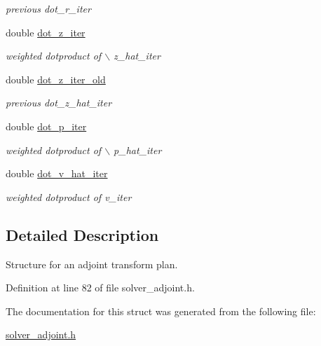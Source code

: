 \begin{CompactItemize}
\begin{CompactList}\small\item\em previous dot\_\-r\_\-iter \item\end{CompactList}\item 
\hypertarget{structinfft__adjoint__plan_6cca862303d84903e408f5a2ea02aa9c}{
double \hyperlink{structinfft__adjoint__plan_6cca862303d84903e408f5a2ea02aa9c}{dot\_\-z\_\-iter}}
\label{structinfft__adjoint__plan_6cca862303d84903e408f5a2ea02aa9c}

\begin{CompactList}\small\item\em weighted dotproduct of $\backslash$ z\_\-hat\_\-iter \item\end{CompactList}\item 
\hypertarget{structinfft__adjoint__plan_a78f22f1c5c917f665b2f1af3e7df191}{
double \hyperlink{structinfft__adjoint__plan_a78f22f1c5c917f665b2f1af3e7df191}{dot\_\-z\_\-iter\_\-old}}
\label{structinfft__adjoint__plan_a78f22f1c5c917f665b2f1af3e7df191}

\begin{CompactList}\small\item\em previous dot\_\-z\_\-hat\_\-iter \item\end{CompactList}\item 
\hypertarget{structinfft__adjoint__plan_2ddddb18e229f9d2d4b9eb11c36d0529}{
double \hyperlink{structinfft__adjoint__plan_2ddddb18e229f9d2d4b9eb11c36d0529}{dot\_\-p\_\-iter}}
\label{structinfft__adjoint__plan_2ddddb18e229f9d2d4b9eb11c36d0529}

\begin{CompactList}\small\item\em weighted dotproduct of $\backslash$ p\_\-hat\_\-iter \item\end{CompactList}\item 
\hypertarget{structinfft__adjoint__plan_1a005f3e97b207a1d42cbc8e2ad3a5e1}{
double \hyperlink{structinfft__adjoint__plan_1a005f3e97b207a1d42cbc8e2ad3a5e1}{dot\_\-v\_\-hat\_\-iter}}
\label{structinfft__adjoint__plan_1a005f3e97b207a1d42cbc8e2ad3a5e1}

\begin{CompactList}\small\item\em weighted dotproduct of v\_\-iter \item\end{CompactList}\end{CompactItemize}


\subsection{Detailed Description}
Structure for an adjoint transform plan. 

Definition at line 82 of file solver\_\-adjoint.h.

The documentation for this struct was generated from the following file:\begin{CompactItemize}
\item 
\hyperlink{solver__adjoint_8h}{solver\_\-adjoint.h}\end{CompactItemize}

